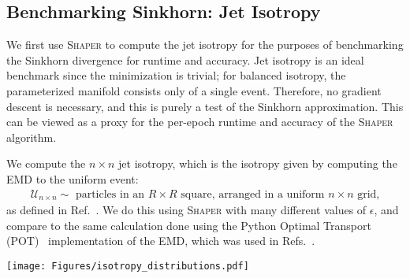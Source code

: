 \documentclass[letterpaper,11pt]{article}
\DeclareRobustCommand{\Refer}[1]{Ref.~\cite{#1}}
\DeclareRobustCommand{\Refers}[1]{Refs.~\cite{#1}}
\newcommand{\Shaper}{\textsc{Shaper}\xspace}
\begin{document}
\subsection{Benchmarking Sinkhorn: Jet Isotropy}\label{sec:benchmarking_sinkhorn}

We first use \Shaper to compute the jet isotropy for the purposes of benchmarking the Sinkhorn divergence for runtime and accuracy. Jet isotropy is an ideal benchmark since the minimization is trivial; for balanced isotropy, the parameterized manifold consists only of a single event. Therefore, no gradient descent is necessary, and this is purely a test of the Sinkhorn approximation. This can be viewed as a proxy for the per-epoch runtime and accuracy of the \Shaper algorithm. 

We compute the $n\times n$ jet isotropy, which is the isotropy given by computing the EMD to the uniform event:
%
\begin{align}
    \mathcal{U}_{n\times n} \sim \text{ particles in an } R\times R  \text{ square, arranged in a uniform } n\times n \text{ grid,}
\end{align}
%
as defined in \Refer{Cesarotti:2020hwb}. We do this using \Shaper with many different values of $\epsilon$, and compare to the same calculation done using the Python Optimal Transport (POT)~\cite{flamary2021pot} implementation of the EMD, which was used in \Refers{Cesarotti:2020hwb, Cesarotti_2021}. 


\begin{figure*}[tp]
    \centering
    \caption{
         The (a) fidelity and (b) runtime of \Shaper when computing the $n\times n$ jet isotropy,  for different values of $\epsilon$, $n$, and $\beta$. The fidelity is defined as the ratio of the Sinkhorn divergence to the ``true'' Wasserstein metric, as computed using the POT library, across a batch of 1000 events. The runtime is the total time to evaluate the Sinkhorn divergences for the entire 1000 event batch, as computed using a NVIDIA A100. An annealing parameter of $\Delta = 0.9$ is used globally. 
        }
    \label{fig:isotropy_benchmark}
\end{figure*}



\begin{figure*}[tp]
    \centering

        \texttt{[image: Figures/isotropy\_distributions.pdf]}

    \caption{
       Distributions of the learned $16\times 16$ jet isotropy, for $\beta = 1$ (red) and $\beta = 2$ (blue), as calculated using the POT library (filled) and \Shaper (points) with $\epsilon^\beta = 10^{-3}$. 
        }
    \label{fig:isotropy_distributions}
\end{figure*}
\end{document}
